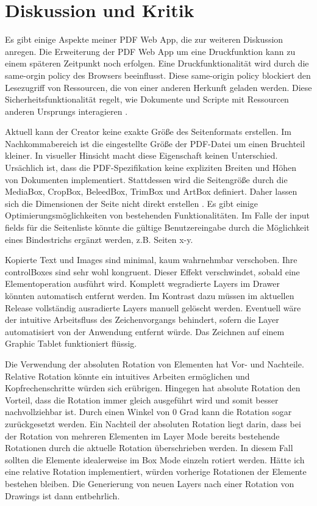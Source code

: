 \chapter{Diskussion und Kritik}
Es gibt einige Aspekte meiner PDF Web App, die zur weiteren Diskussion anregen. Die Erweiterung der PDF Web App um eine Druckfunktion kann zu einem späteren Zeitpunkt noch erfolgen. Eine Druckfunktionalität wird durch die same-orgin policy des Browsers beeinflusst. Diese same-origin policy blockiert den Lesezugriff von Ressourcen, die von einer anderen Herkunft geladen werden. Diese Sicherheitsfunktionalität regelt, wie Dokumente und Scripte mit Ressourcen anderen Ursprungs interagieren \cite{same-origin}. 
\par
Aktuell kann der Creator keine exakte Größe des Seitenformats erstellen. Im Nachkommabereich ist die eingestellte Größe der PDF-Datei um einen Bruchteil kleiner. In visueller Hinsicht macht diese Eigenschaft keinen Unterschied. Ursächlich ist, dass die PDF-Spezifikation keine expliziten Breiten und Höhen von Dokumenten implementiert. Stattdessen wird die Seitengröße durch die MediaBox, CropBox, BeleedBox, TrimBox und ArtBox definiert. Daher lassen sich die Dimensionen der Seite nicht direkt erstellen \cite{pdf-lib-pagesize}. Es gibt einige Optimierungsmöglichkeiten von bestehenden Funktionalitäten. Im Falle der input fields für die Seitenliste könnte die gültige Benutzereingabe durch die Möglichkeit eines Bindestrichs ergänzt werden, z.B. Seiten x-y. 
\par
Kopierte Text und Images sind minimal, kaum wahrnehmbar verschoben. Ihre controlBoxes sind sehr wohl kongruent. Dieser Effekt verschwindet, sobald eine Elementoperation ausführt wird. Komplett wegradierte Layers im Drawer könnten automatisch entfernt werden. Im Kontrast dazu müssen im aktuellen Release vollständig ausradierte Layers manuell gelöscht werden. Eventuell wäre der intuitive Arbeitsfluss des Zeichenvorgangs behindert, sofern die Layer automatisiert von der Anwendung entfernt würde. Das Zeichnen auf einem Graphic Tablet funktioniert flüssig. 
\par
Die Verwendung der absoluten Rotation von Elementen hat Vor- und Nachteile. Relative Rotation könnte ein intuitives Arbeiten ermöglichen und Kopfrechenschritte würden sich erübrigen. Hingegen hat absolute Rotation den Vorteil, dass die Rotation immer gleich ausgeführt wird und somit besser nachvollziehbar ist. Durch einen Winkel von 0 Grad kann die Rotation sogar zurückgesetzt werden. Ein Nachteil der absoluten Rotation liegt darin, dass bei der Rotation von mehreren Elementen im Layer Mode bereits bestehende Rotationen durch die aktuelle Rotation überschrieben werden. In diesem Fall sollten die Elemente idealerweise im Box Mode einzeln rotiert werden. Hätte ich eine relative Rotation implementiert, würden vorherige Rotationen der Elemente bestehen bleiben. Die Generierung von neuen Layers nach einer Rotation von Drawings ist dann entbehrlich. 
